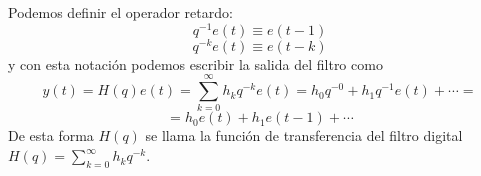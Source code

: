 \begin{nota}
Podemos definir el operador retardo:
\[	q^{-1}e(t) \equiv e(t-1)	\]
\[	q^{-k}e(t) \equiv e(t-k)	\]
y con esta notación podemos escribir la salida del filtro como
\[	y(t) = H(q)e(t) = \sum_{k=0}^{\infty} h_k q^{-k} e(t) = h_0q^{-0}+h_1q^{-1}e(t)+ \cdots = \]
\[ = h_0e(t) + h_1e(t-1) + \cdots	\]
De esta forma $H(q)$ se llama la función de transferencia del filtro digital $H(q) = \sum_{k=0}^{\infty} h_k q^{-k}$.
\end{nota}





%